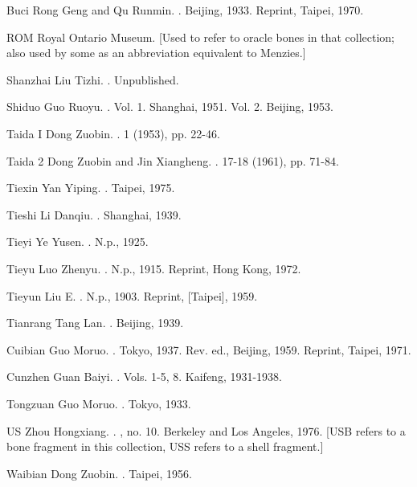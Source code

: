 \begin{list}{}
  \item[Buci] Rong Geng and Qu Runmin. . Beijing, 1933. Reprint, Taipei, 1970.
  \item[ROM] Royal Ontario Museum. [Used to refer to oracle bones in that collection; also used by some as an abbreviation equivalent to Menzies.]
  \item[Shanzhai] Liu Tizhi. . Unpublished.
  \item[Shiduo] Guo Ruoyu. . Vol. 1. Shanghai, 1951. Vol. 2. Beijing, 1953.
  \item[Taida I] Dong Zuobin. .  1 (1953), pp. 22-46.
  \item[Taida 2] Dong Zuobin and Jin Xiangheng. .  17-18 (1961), pp. 71-84.
  \item[Tiexin] Yan Yiping. . Taipei, 1975.
  \item[Tieshi] Li Danqiu. . Shanghai, 1939.
  \item[Tieyi] Ye Yusen. . N.p., 1925.
  \item[Tieyu] Luo Zhenyu. . N.p., 1915. Reprint, Hong Kong, 1972.
  \item[Tieyun] Liu E. . N.p., 1903. Reprint, [Taipei], 1959.
  \item[Tianrang] Tang Lan. . Beijing, 1939.
  \item[Cuibian] Guo Moruo. . Tokyo, 1937. Rev. ed., Beijing, 1959. Reprint, Taipei, 1971.
  \item[Cunzhen] Guan Baiyi. . Vols. 1-5, 8. Kaifeng, 1931-1938.
  \item[Tongzuan] Guo Moruo. . Tokyo, 1933.
  \item[US] Zhou Hongxiang. . , no. 10. Berkeley and Los Angeles, 1976. [USB refers to a bone fragment in this collection, USS refers to a shell fragment.]
  \item[Waibian] Dong Zuobin. . Taipei, 1956.

\end{list}

